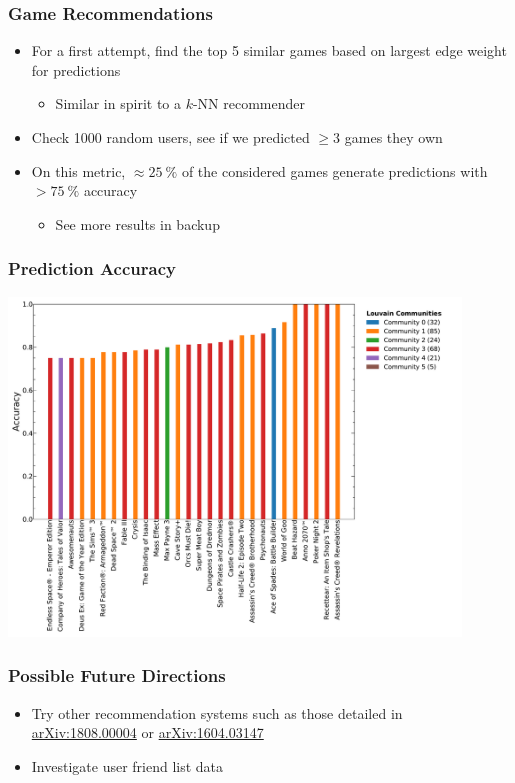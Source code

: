 \documentclass[18pt,xcolor=table]{beamer} \usefonttheme[onlymath]{serif}
\begin{document}
\begin{frame}
  \frametitle{Game Recommendations}
  \begin{itemize}
    \item For a first attempt, find the top 5 similar games based on largest edge weight for predictions
    \begin{itemize}
      \item Similar in spirit to a $k$-NN recommender
    \end{itemize}
    \vspace{0.2cm}
    \item Check \num{1000} random users, see if we predicted $\geq 3$ games they own
    \vspace{0.2cm}
    \item On this metric, $\approx \SI{25}{\percent}$ of the considered games generate predictions with $> \SI{75}{\percent}$ accuracy
    \begin{itemize}
      \item See more results in backup
    \end{itemize}
  \end{itemize}
\end{frame}

\begin{frame}
  \frametitle{Prediction Accuracy}
  \centering
  \includegraphics[width=0.9\textwidth]{../output/prediction_acc_high.pdf}
\end{frame}

\begin{frame}
  \frametitle{Possible Future Directions}
  \begin{itemize}
    \item Try other recommendation systems such as those detailed in\\\href{http://arxiv.org/abs/1808.00004}{arXiv:1808.00004} or \href{http://arxiv.org/abs/1604.03147}{arXiv:1604.03147}
    \vspace{0.2cm}
    \item Investigate user friend list data
  \end{itemize}
\end{frame}
\end{document}
